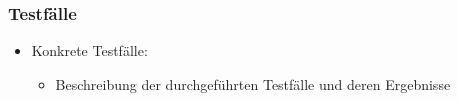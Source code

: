 \subsubsection{Testfälle}\label{testfuxe4lle}

\begin{itemize}
  \item
        Konkrete Testfälle:

        \begin{itemize}

          \item
                Beschreibung der durchgeführten Testfälle und deren Ergebnisse
        \end{itemize}
\end{itemize}